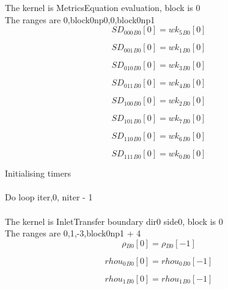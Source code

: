 \documentclass{article}
\begin{document}
\noindent The kernel is MetricsEquation evaluation, block is 0\\\noindent The ranges are 0,block0np0,0,block0np1\\\begin{dmath}{SD_{000}{_{B0}}}[{0}] = {wk_{5}{_{B0}}}[{0}]\end{dmath}

\begin{dmath}{SD_{001}{_{B0}}}[{0}] = {wk_{1}{_{B0}}}[{0}]\end{dmath}

\begin{dmath}{SD_{010}{_{B0}}}[{0}] = {wk_{3}{_{B0}}}[{0}]\end{dmath}

\begin{dmath}{SD_{011}{_{B0}}}[{0}] = {wk_{4}{_{B0}}}[{0}]\end{dmath}

\begin{dmath}{SD_{100}{_{B0}}}[{0}] = {wk_{2}{_{B0}}}[{0}]\end{dmath}

\begin{dmath}{SD_{101}{_{B0}}}[{0}] = {wk_{7}{_{B0}}}[{0}]\end{dmath}

\begin{dmath}{SD_{110}{_{B0}}}[{0}] = {wk_{6}{_{B0}}}[{0}]\end{dmath}

\begin{dmath}{SD_{111}{_{B0}}}[{0}] = {wk_{0}{_{B0}}}[{0}]\end{dmath}

\noindent Initialising timers\\
\\\noindent Do loop iter,0, niter - 1\\
\\\noindent The kernel is InletTransfer boundary dir0 side0, block is 0\\\noindent The ranges are 0,1,-3,block0np1 + 4\\\begin{dmath}{\rho{_{B0}}}[{0}] = {\rho{_{B0}}}[{-1}]\end{dmath}

\begin{dmath}{rhou_{0}{_{B0}}}[{0}] = {rhou_{0}{_{B0}}}[{-1}]\end{dmath}

\begin{dmath}{rhou_{1}{_{B0}}}[{0}] = {rhou_{1}{_{B0}}}[{-1}]\end{dmath}
\end{document}
